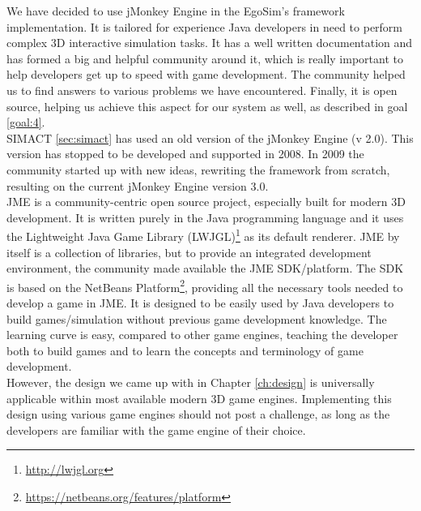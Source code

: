 We have decided to use jMonkey Engine in the EgoSim's framework implementation. It is tailored for experience Java developers in need to perform complex 3D interactive simulation tasks. It has a well written documentation and has formed a big and helpful community around it, which is really important to help developers get up to speed with game development. The community helped us to find answers to various problems we have encountered. Finally, it is open source, helping us achieve this aspect for our system as well, as described in goal \ref{goal:4}.\\

SIMACT \ref{sec:simact} has used an old version of the jMonkey Engine (v 2.0). This version has stopped to be developed and supported in 2008. In 2009 the community started up with new ideas, rewriting the framework from scratch, resulting on the current jMonkey Engine version 3.0.\\

JME is a community-centric open source project, especially built for modern 3D development. It is written purely in the Java programming language and it uses the Lightweight Java Game Library (LWJGL)\footnote{\url{http://lwjgl.org}} as its default renderer. JME by itself is a collection of libraries, but to provide an integrated development environment, the community made available the JME SDK/platform. The SDK is based on the NetBeans Platform\footnote{\url{https://netbeans.org/features/platform}}, providing all the necessary tools needed to develop a game in JME. It is designed to be easily used by Java developers to build games/simulation without previous game development knowledge. The learning curve is easy, compared to other game engines, teaching the developer both to build games and to learn the concepts and terminology of game development.\\

However, the design we came up with in Chapter \ref{ch:design} is universally applicable within most available modern 3D game engines. Implementing this design using various game engines should not post a challenge, as long as the developers are familiar with the game engine of their choice.\\

